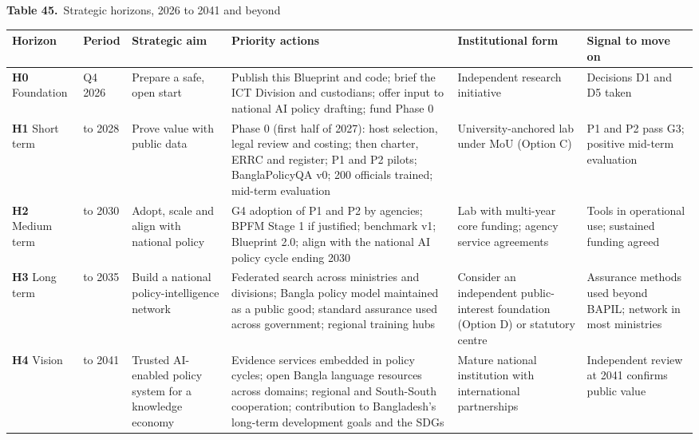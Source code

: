 \documentclass[border=10pt]{standalone}
\begin{document}
\begin{minipage}{22cm}
{\large\bfseries Table 45.}\ {\large Strategic horizons, 2026 to 2041 and beyond}\par\vspace{7pt}
\small
{}
\begin{tabularx}{\linewidth}{@{}>{\hsize=0.675\hsize\raggedright\arraybackslash}X>{\hsize=0.525\hsize\raggedright\arraybackslash}X>{\hsize=1.100\hsize\raggedright\arraybackslash}X>{\hsize=1.700\hsize\raggedright\arraybackslash}X>{\hsize=0.950\hsize\raggedright\arraybackslash}X>{\hsize=1.050\hsize\raggedright\arraybackslash}X@{}}
\arrayrulecolor{bapilrule}\toprule
\rowcolor{white}\textbf{Horizon} & \textbf{Period} & \textbf{Strategic aim} & \textbf{Priority actions} & \textbf{Institutional form} & \textbf{Signal to move on} \\
\midrule
\textbf{H0} Foundation & Q4 2026 & Prepare a safe, open start & Publish this Blueprint and code; brief the ICT Division and custodians; offer input to national AI policy drafting; fund Phase 0 & Independent research initiative & Decisions D1 and D5 taken \\
\textbf{H1} Short term & 2027 to 2028 & Prove value with public data & Phase 0 (first half of 2027): host selection, legal review and costing; then charter, ERRC and register; P1 and P2 pilots; BanglaPolicyQA v0; 200 officials trained; mid-term evaluation & University-anchored lab under MoU (Option C) & P1 and P2 pass G3; positive mid-term evaluation \\
\textbf{H2} Medium term & 2029 to 2030 & Adopt, scale and align with national policy & G4 adoption of P1 and P2 by agencies; BPFM Stage 1 if justified; benchmark v1; Blueprint 2.0; align with the national AI policy cycle ending 2030 & Lab with multi-year core funding; agency service agreements & Tools in operational use; sustained funding agreed \\
\textbf{H3} Long term & 2031 to 2035 & Build a national policy-intelligence network & Federated search across ministries and divisions; Bangla policy model maintained as a public good; standard assurance used across government; regional training hubs & Consider an independent public-interest foundation (Option D) or statutory centre & Assurance methods used beyond BAPIL; network in most ministries \\
\textbf{H4} Vision & 2036 to 2041 & Trusted AI-enabled policy system for a knowledge economy & Evidence services embedded in policy cycles; open Bangla language resources across domains; regional and South-South cooperation; contribution to Bangladesh’s long-term development goals and the SDGs & Mature national institution with international partnerships & Independent review at 2041 confirms public value \\

\end{tabularx}
\end{minipage}
\end{document}
